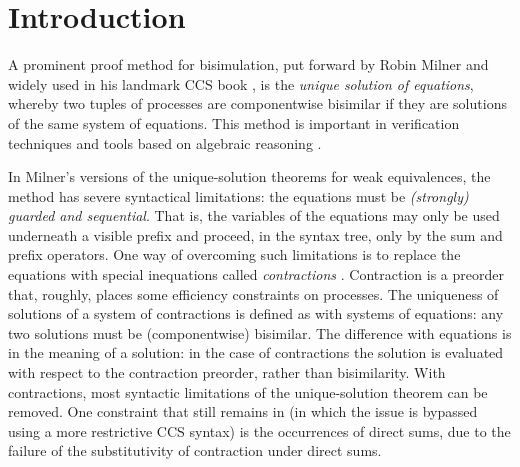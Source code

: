 \section{Introduction}

A prominent proof method for bisimulation, put forward by Robin Milner and widely used in his
landmark CCS book \cite{Mil89}, is the
\emph{unique solution of equations}, whereby two tuples of processes are
componentwise bisimilar if they are solutions 
of the same system of equations.
This method is important in verification techniques and tools
based on algebraic reasoning \cite{BaeBOOK,theoryAndPractice,RosUnder10}. 

In Milner's versions of the unique-solution theorems for weak
equivalences,
 the  method has severe syntactical limitations:
the equations must be \emph{(strongly) guarded and sequential}. That is, the
variables of the equations may only be used underneath a visible
prefix and proceed, in the syntax tree, only by the sum and prefix operators.
One way of overcoming such limitations is to replace the equations
 with special inequations called
\emph{contractions} \cite{sangiorgi2015equations,sangiorgi2017equations}. Contraction is a
preorder that, roughly, places some efficiency
constraints on processes.  The uniqueness of solutions of a system of contractions
is defined as with systems of equations: any two solutions must be (componentwise) bisimilar.
The difference with equations is in the meaning of a solution:
in the case of contractions the solution is evaluated with respect to
the contraction preorder, rather than bisimilarity. 
With contractions, most syntactic limitations of the unique-solution theorem can be
removed.  One constraint that still remains in
\cite{sangiorgi2017equations} (in which the issue is bypassed using a more
restrictive CCS syntax)
is the occurrences of direct sums, due to the failure of the
substitutivity of contraction under direct sums.

